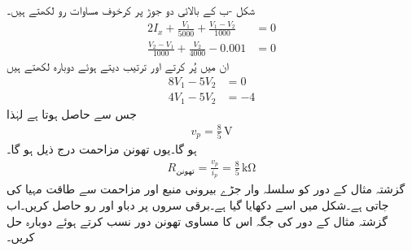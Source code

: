 شکل -ب کے بالائی دو جوڑ پر کرخوف مساوات رو لکھتے ہیں۔
\begin{align*}
2I_x +\frac{V_1}{5000}+\frac{V_1-V_2}{1000}&=0\\
\frac{V_2-V_1}{1000}+\frac{V_2}{4000}-0.001&=0
\end{align*}
ان میں  پُر کرتے اور ترتیب دیتے ہوئے دوبارہ لکھتے ہیں
\begin{align*}
8V_1-5V_2&=0\\
4V_1-5V_2&=-4
\end{align*}
جس سے  حاصل ہوتا ہے لہٰذا
\begin{align*}
v_p=\frac{8}{5} \, \si{\volt}
\end{align*}
ہو گا۔یوں تھونن مزاحمت درج ذیل ہو گا۔
\begin{align*}
R_{\text{تھونن}}=\frac{v_p}{i_p}=\frac{8}{5}\,\si{\kilo\ohm}
\end{align*}
گزشتہ مثال کے دور کو سلسلہ وار جڑے بیرونی منبع  اور مزاحمت سے طاقت مہیا کی جاتی ہے۔شکل  میں اسے دکھایا گیا ہے۔برقی سروں پر دباو  اور رو  حاصل کریں۔اب گزشتہ مثال کے دور کی جگہ اس کا مساوی تھونن دور نسب کرتے ہوئے دوبارہ حل کریں۔
